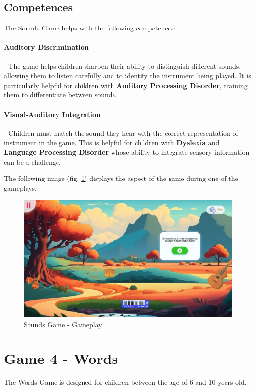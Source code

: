 \subsection{Competences}
The Sounds Game helps with the following competences:

\paragraph{Auditory Discrimination}- The game helps children sharpen their ability to distinguish different sounds, allowing them to listen carefully and to identify the instrument being played. It is particularly helpful for children with \textbf{Auditory Processing Disorder}, training them to differentiate between sounds.

\paragraph{Visual-Auditory Integration}- Children must match the sound they hear with the correct representation of instrument in the game. This is helpful for children with \textbf{Dyslexia} and \textbf{Language Processing Disorder} whose ability to integrate sensory information can be a challenge.

The following image (fig. \ref{fig:soundsGameplay}) displays the aspect of the game during one of the gameplays.
\begin{figure}[H]
    \centering
    \includegraphics[scale=0.45]{Chapters/gameplay/SoundsGame.jpg}
    \caption{Sounds Game - Gameplay}
    \label{fig:soundsGameplay}    
\end{figure}

\newpage
\section{Game 4 - Words}
The Words Game is designed for children between the age of 6 and 10 years old.

